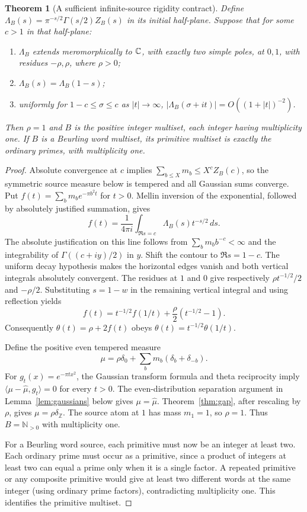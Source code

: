 \documentclass[11pt]{article}
\newtheorem{theorem}{Theorem}
\theoremstyle{remark}\newtheorem{remark}[theorem]{Remark}
\newcommand{\Z}{\mathbb Z}\newcommand{\N}{\mathbb N}
\newcommand{\dd}{\,d}\newcommand{\comb}[1]{\delta_{#1}}
\begin{document}
\begin{theorem}[A sufficient infinite-source rigidity contract]
\label{thm:infinite}
Define $\Lambda_B(s)=\pi^{-s/2}\Gamma(s/2)Z_B(s)$ in its initial
half-plane. Suppose that for some $c>1$ in that half-plane:
\begin{enumerate}
\item $\Lambda_B$ extends meromorphically to $\mathbb C$, with exactly two
simple poles, at $0,1$, with residues $-\rho,\rho$, where $\rho>0$;
\item $\Lambda_B(s)=\Lambda_B(1-s)$;
\item uniformly for $1-c\leq\sigma\leq c$ as $|t|\to\infty$,
$|\Lambda_B(\sigma+it)|=O((1+|t|)^{-2})$.
\end{enumerate}
Then $\rho=1$ and $B$ is the positive integer multiset, each integer
having multiplicity one. If $B$ is a Beurling word multiset, its primitive
multiset is exactly the ordinary primes, with multiplicity one.
\end{theorem}
\begin{proof}
Absolute convergence at $c$ implies
$\sum_{b\leq X}m_b\leq X^c Z_B(c)$, so the symmetric source measure
below is tempered and all Gaussian sums converge. Put
$f(t)=\sum_bm_b e^{-\pi b^2t}$ for $t>0$. Mellin inversion of the
exponential, followed by absolutely justified summation, gives
\begin{equation}\label{eq:mellin}
 f(t)=\frac1{4\pi i}\int_{\Re s=c}\Lambda_B(s)t^{-s/2}\dd s.
\end{equation}
The absolute justification on this line follows from
$\sum_bm_b b^{-c}<\infty$ and the integrability of
$\Gamma((c+iy)/2)$ in $y$. Shift the contour to $\Re s=1-c$.
The uniform decay hypothesis makes the horizontal edges vanish and both
vertical integrals absolutely convergent. The residues at $1$ and $0$
give respectively $\rho t^{-1/2}/2$ and $-\rho/2$. Substituting
$s=1-w$ in the remaining vertical integral and using reflection yields
\[
 f(t)=t^{-1/2}f(1/t)+\frac\rho2(t^{-1/2}-1).
\]
Consequently $\theta(t)=\rho+2f(t)$ obeys
$\theta(t)=t^{-1/2}\theta(1/t)$.

Define the positive even tempered measure
\[
 \mu=\rho\delta_0+\sum_bm_b(\delta_b+\delta_{-b}).
\]
For $g_t(x)=e^{-\pi tx^2}$, the Gaussian transform formula and theta
reciprocity imply $\langle\mu-\widehat\mu,g_t\rangle=0$ for every
$t>0$. The even-distribution separation argument in
Lemma~\ref{lem:gaussians} below gives $\mu=\widehat\mu$.
Theorem~\ref{thm:gap}, after rescaling by $\rho$, gives
$\mu=\rho\comb{\Z}$. The source atom at $1$ has mass $m_1=1$,
so $\rho=1$. Thus $B=\N_{>0}$ with multiplicity one.

For a Beurling word source, each primitive must now be an integer at least
two. Each ordinary prime must occur as a primitive, since a product of
integers at least two can equal a prime only when it is a single factor.
A repeated primitive or any composite primitive would give at least two
different words at the same integer (using ordinary prime factors),
contradicting multiplicity one. This identifies the primitive multiset.
\end{proof}
\end{document}
